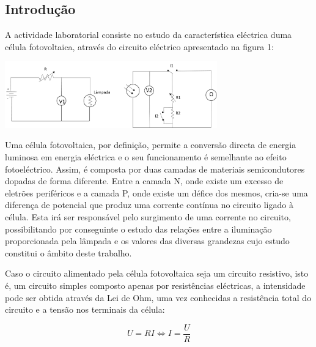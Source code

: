 \documentclass[10pt]{extarticle}
\begin{document}
\begin{multicols}{2}

\section{Introdução}

\par A actividade laboratorial consiste no estudo da característica eléctrica duma célula fotovoltaica, através do circuito eléctrico apresentado na figura 1:

\hspace{-0.8cm}
\includegraphics[width=260pt]{circuito}
\begin{center}
\par{}
\end{center}

\par Uma célula fotovoltaica, por definição, permite a conversão directa de energia luminosa em energia eléctrica e o seu funcionamento é semelhante ao efeito fotoeléctrico. Assim, é composta por duas camadas de materiais semicondutores dopadas de forma diferente. Entre a camada N, onde existe um excesso de eletrões periféricos e a camada P, onde existe um défice dos mesmos, cria-se uma diferença de potencial que produz uma corrente contínua no circuito ligado à célula. Esta irá ser responsável pelo surgimento de uma corrente no circuito, possibilitando por conseguinte o estudo das relações entre a iluminação proporcionada pela lâmpada e os valores das diversas grandezas cujo estudo constitui o âmbito deste trabalho. 

\par Caso o circuito alimentado pela célula fotovoltaica seja um circuito resistivo, isto é, um circuito simples composto apenas por resistências eléctricas, a intensidade pode ser obtida através da Lei de Ohm, uma vez conhecidas a resistência total do circuito e a tensão nos terminais da célula:

\begin{equation} \label{eq1}
U=RI \Leftrightarrow I=\frac{U}{R}
\end{equation}


\end{multicols}
\end{document}

